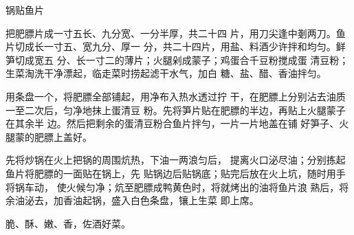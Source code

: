\begin{recipe}{锅贴鱼片}

\ingredients



\cooking

\step 把肥膘片成一寸五长、九分宽、一分半厚，共二十四 片，用刀尖逢中剗两刀。鱼片切成长一寸五、宽九分、厚一 分，共二十四片，用盐、料酒少许拌和均匀。鲜笋切成宽五 分、长一寸二的薄片；火腿剁成蒙子；鸡蛋合千豆粉搅成蛋 清豆粉；生菜淘洗干净漂起，临走菜时捞起滤干水气，加白 糖、盐、醋、香油拌匀。

用条盘一个，将肥膘全部铺起，用净布入热水透过拧 干，在肥膘上分别沾去油质一至二次后，匀净地抹上蛋清豆 粉。先将笋片贴在肥膘的半边，再贴上火腿蒙子在其余半 边。然后把剩余的蛋清豆粉合鱼片拌勻，一片一片地盖在铺 好笋子、火腿蒙的肥膘上盖好。

\step 先将炒锅在火上把锅的周围炕热，下油一两浪匀后， 提离火口泌尽油；分别拣起鱼片将肥膘的一面贴在锅上，先 贴锅边后贴锅底；贴完后放在火上坑，随时用手将锅车动， 使火候匀净；炕至肥膘成鸭黄色时，将就烤出的油将鱼片浪 熟后，将余油泌去，加香油起锅，盛入白色条盘，镶上生菜 即上席。

\notes

脆、酥、嫩、香，佐酒好菜。

\end{recipe}

